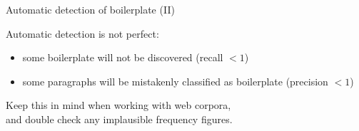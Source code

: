 

\begin{frame}
{Automatic detection of boilerplate (II)}

Automatic detection is not perfect:

\begin{itemize}
\item some boilerplate will not be discovered (recall $<1$)
\item some paragraphs will be mistakenly classified as boilerplate (precision $<1$)
\end{itemize}

Keep this in mind when working with web corpora,\\
and double check any implausible frequency figures.
  
\end{frame}




